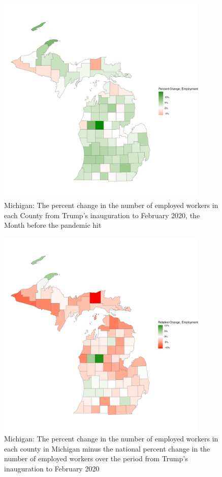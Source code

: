 \documentclass[11pt]{article}
\begin{document}
\begin{figure}
    \centering
    \includegraphics[width=0.9\textwidth]{plots/raw-employment-plot.png}
    \caption{Michigan: The percent change in the number of employed workers in each County from Trump's inauguration to February 2020, the Month before the pandemic hit}
\end{figure}
\begin{figure}
    \centering
    \includegraphics[width=0.9\textwidth]{plots/relative-employment-plot.png}
    \caption{Michigan: The percent change in the number of employed workers in each county in Michigan minus the national percent change in the number of employed workers over the period from Trump's inauguration to February 2020}
\end{figure}
\end{document}

